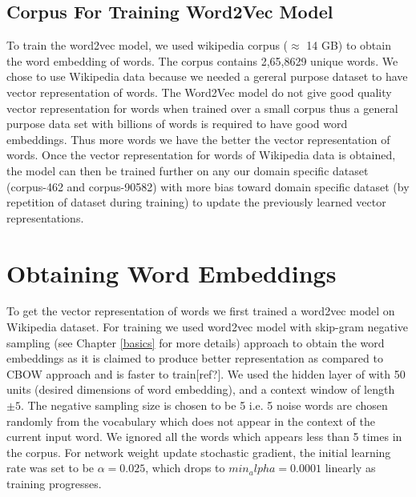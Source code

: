 \subsection{Corpus For Training Word2Vec Model}

To train the word2vec model, we used wikipedia corpus ($\approx$ 14 GB) to obtain the word embedding of words. The corpus contains 2,65,8629 unique words. We chose to use Wikipedia data because we needed a gereral purpose dataset to have vector representation of words. The Word2Vec model do not give good quality vector representation for words when trained over a small corpus thus a general purpose data set with billions of words is required to have good word embeddings. Thus more words we have the better the vector representation of words. Once the vector representation for words of Wikipedia data is obtained, the model can then be trained further on any our domain specific dataset (corpus-462 and corpus-90582) with more bias toward domain specific dataset (by repetition of dataset during training) to update the previously learned vector representations. 

\section{Obtaining Word Embeddings} \label{get_word_embeddings}

To get the vector representation of words we first trained a word2vec model on Wikipedia dataset. For training we used word2vec model with skip-gram negative sampling (see Chapter \ref{basics} for more details) approach to obtain the word embeddings as it is claimed to produce better representation as compared to CBOW approach and is faster to train[ref?]. We used the hidden layer of with 50 units (desired dimensions of word embedding), and  a context window of length $\pm 5$. The negative sampling size is chosen to be 5 i.e. 5 noise words are chosen randomly from the vocabulary which does not appear in the context of the current input word. We ignored all the words which appears less than 5 times in the corpus. For network weight update stochastic gradient, the initial learning rate was set to be $\alpha=0.025$, which drops to $min_alpha=0.0001$ linearly as training progresses. 

